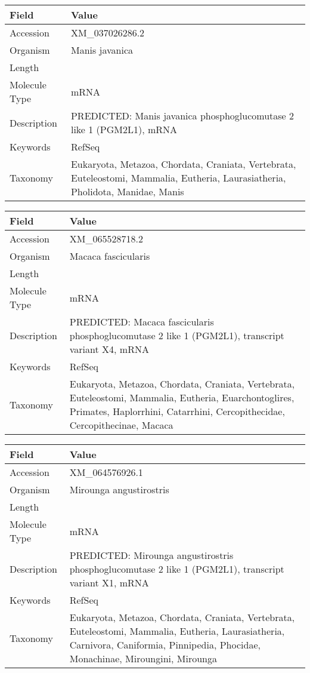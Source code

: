\documentclass[10pt]{article}
\begin{document}
\vspace{1em}
{\footnotesize
\begin{longtable}{>{\raggedright\arraybackslash}p{4.5cm} >{\raggedright\arraybackslash}p{11.5cm}}
\textbf{Field} & \textbf{Value} \\
\hline
Accession & XM\_037026286.2 \\
Organism & Manis javanica \\
Length & 8021 \\
Molecule Type & mRNA \\
Description & PREDICTED: Manis javanica phosphoglucomutase 2 like 1 (PGM2L1), mRNA \\
Keywords & RefSeq \\
Taxonomy & Eukaryota, Metazoa, Chordata, Craniata, Vertebrata, Euteleostomi, Mammalia, Eutheria, Laurasiatheria, Pholidota, Manidae, Manis \\
\end{longtable}
}

\vspace{1em}
{\footnotesize
\begin{longtable}{>{\raggedright\arraybackslash}p{4.5cm} >{\raggedright\arraybackslash}p{11.5cm}}
\textbf{Field} & \textbf{Value} \\
\hline
Accession & XM\_065528718.2 \\
Organism & Macaca fascicularis \\
Length & 4109 \\
Molecule Type & mRNA \\
Description & PREDICTED: Macaca fascicularis phosphoglucomutase 2 like 1 (PGM2L1), transcript variant X4, mRNA \\
Keywords & RefSeq \\
Taxonomy & Eukaryota, Metazoa, Chordata, Craniata, Vertebrata, Euteleostomi, Mammalia, Eutheria, Euarchontoglires, Primates, Haplorrhini, Catarrhini, Cercopithecidae, Cercopithecinae, Macaca \\
\end{longtable}
}

\vspace{1em}
{\footnotesize
\begin{longtable}{>{\raggedright\arraybackslash}p{4.5cm} >{\raggedright\arraybackslash}p{11.5cm}}
\textbf{Field} & \textbf{Value} \\
\hline
Accession & XM\_064576926.1 \\
Organism & Mirounga angustirostris \\
Length & 8296 \\
Molecule Type & mRNA \\
Description & PREDICTED: Mirounga angustirostris phosphoglucomutase 2 like 1 (PGM2L1), transcript variant X1, mRNA \\
Keywords & RefSeq \\
Taxonomy & Eukaryota, Metazoa, Chordata, Craniata, Vertebrata, Euteleostomi, Mammalia, Eutheria, Laurasiatheria, Carnivora, Caniformia, Pinnipedia, Phocidae, Monachinae, Miroungini, Mirounga \\
\end{longtable}
}
\end{document}

